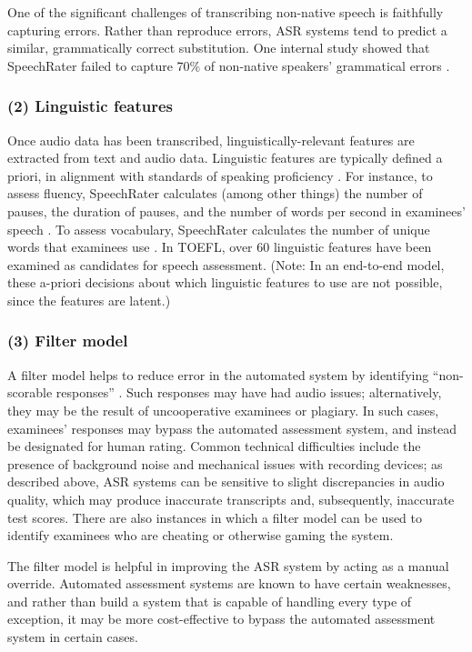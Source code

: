 \documentclass [PhD] {uclathes}
\begin{document}
One of the significant challenges of transcribing non-native speech is faithfully capturing errors. Rather than reproduce errors, ASR systems tend to predict a similar, grammatically correct substitution. One internal study showed that SpeechRater failed to capture 70\% of non-native speakers’ grammatical errors \citep{yoon2019features}.

\subsubsection{(2) Linguistic features}

Once audio data has been transcribed, linguistically-relevant features are extracted from text and audio data. Linguistic features are typically defined a priori, in alignment with standards of speaking proficiency \citep[e.g.][]{brown2005examination}. For instance, to assess fluency, SpeechRater calculates (among other things) the number of pauses, the duration of pauses, and the number of words per second in examinees’ speech \citep{hsieh2019features}. To assess vocabulary, SpeechRater calculates the number of unique words that examinees use \citep{yoon2019features}. In TOEFL, over 60 linguistic features have been examined as candidates for speech assessment. (Note: In an end-to-end model, these a-priori decisions about which linguistic features to use are not possible, since the features are latent.)

\subsubsection{(3) Filter model}

A filter model helps to reduce error in the automated system by identifying “non-scorable responses” \citep{loukina2019scoring}. Such responses may have had audio issues; alternatively, they may be the result of uncooperative examinees or plagiary. In such cases, examinees’ responses may bypass the automated assessment system, and instead be designated for human rating. Common technical difficulties include the presence of background noise and mechanical issues with recording devices; as described above, ASR systems can be sensitive to slight discrepancies in audio quality, which may produce inaccurate transcripts and, subsequently, inaccurate test scores. There are also instances in which a filter model can be used to identify examinees who are cheating or otherwise gaming the system.

The filter model is helpful in improving the ASR system by acting as a manual override. Automated assessment systems are known to have certain weaknesses, and rather than build a system that is capable of handling every type of exception, it may be more cost-effective to bypass the automated assessment system in certain cases.
\end{document}
